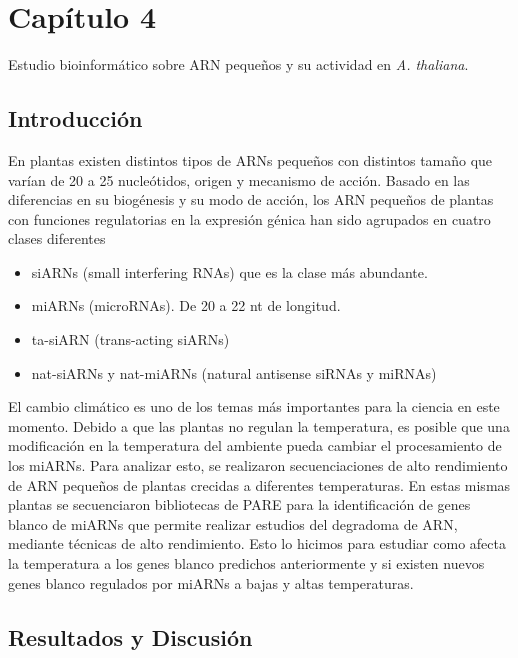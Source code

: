 
\graphicspath{{Chapter4/Figs/}}

\setcounter{chapter}{7}
\chapter*{Capítulo 4} 
\setcounter{figure}{0}
\setcounter{table}{0}
\setcounter{section}{0}

{\LARGE Estudio bioinformático sobre ARN pequeños y su actividad en \textit{A. thaliana}.}

\section{Introducción}

En plantas existen distintos tipos de ARNs pequeños con distintos tamaño que varían de 20 a 25 nucleótidos, origen y mecanismo de acción.
Basado en las diferencias en su biogénesis y su modo de acción, los ARN pequeños de plantas con funciones regulatorias en la expresión génica han sido agrupados en cuatro clases diferentes
\begin{itemize}
	\item siARNs 	(small interfering RNAs) que es la clase más abundante. 
	\item miARNs (microRNAs). De 20 a 22 nt de longitud.
	\item ta-siARN (trans-acting siARNs)
	\item nat-siARNs y nat-miARNs (natural antisense siRNAs y miRNAs)
\end{itemize}

El cambio climático es uno de los temas más importantes para la ciencia en este momento. 
Debido a que las plantas no regulan la temperatura, es posible que una modificación en la temperatura del ambiente pueda cambiar el procesamiento de los miARNs.
Para analizar esto, se realizaron secuenciaciones de alto rendimiento de ARN pequeños de plantas crecidas a diferentes temperaturas.
En estas mismas plantas se secuenciaron bibliotecas de PARE \citep{pmid19247285} para la identificación de genes blanco de miARNs que permite realizar estudios del degradoma de ARN, mediante técnicas de alto rendimiento.
Esto lo hicimos para estudiar como afecta la temperatura a los genes blanco predichos anteriormente y si existen nuevos genes blanco regulados por miARNs a bajas y altas temperaturas.

\section{Resultados y Discusión}

